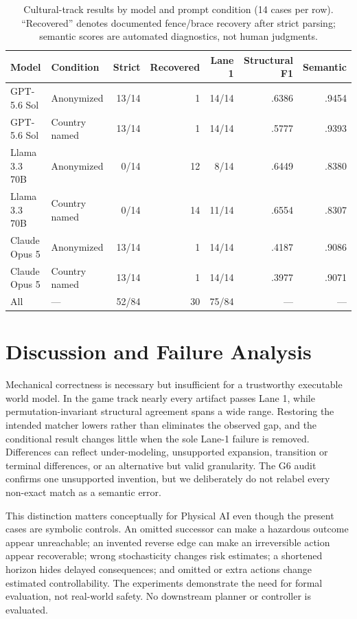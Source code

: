 \documentclass{article}
\begin{document}
\begin{table}[t]
\centering
\small
\caption{Cultural-track results by model and prompt condition (14 cases per row). ``Recovered'' denotes documented fence/brace recovery after strict parsing; semantic scores are automated diagnostics, not human judgments.}
\label{tab:cultural}
\begin{tabular}{llrrrrr}
\toprule
Model & Condition & Strict & Recovered & Lane 1 & Structural F1 & Semantic \\
\midrule
GPT-5.6 Sol & Anonymized & 13/14 & 1 & 14/14 & .6386 & .9454 \\
GPT-5.6 Sol & Country named & 13/14 & 1 & 14/14 & .5777 & .9393 \\
Llama 3.3 70B & Anonymized & 0/14 & 12 & 8/14 & .6449 & .8380 \\
Llama 3.3 70B & Country named & 0/14 & 14 & 11/14 & .6554 & .8307 \\
Claude Opus 5 & Anonymized & 13/14 & 1 & 14/14 & .4187 & .9086 \\
Claude Opus 5 & Country named & 13/14 & 1 & 14/14 & .3977 & .9071 \\
\midrule
All & --- & 52/84 & 30 & 75/84 & --- & --- \\
\bottomrule
\end{tabular}
\end{table}

\section{Discussion and Failure Analysis}
Mechanical correctness is necessary but insufficient for a trustworthy executable world model. In the game track nearly every artifact passes Lane 1, while permutation-invariant structural agreement spans a wide range. Restoring the intended matcher lowers rather than eliminates the observed gap, and the conditional result changes little when the sole Lane-1 failure is removed. Differences can reflect under-modeling, unsupported expansion, transition or terminal differences, or an alternative but valid granularity. The G6 audit confirms one unsupported invention, but we deliberately do not relabel every non-exact match as a semantic error.

This distinction matters conceptually for Physical AI even though the present cases are symbolic controls. An omitted successor can make a hazardous outcome appear unreachable; an invented reverse edge can make an irreversible action appear recoverable; wrong stochasticity changes risk estimates; a shortened horizon hides delayed consequences; and omitted or extra actions change estimated controllability. The experiments demonstrate the need for formal evaluation, not real-world safety. No downstream planner or controller is evaluated.
\end{document}
